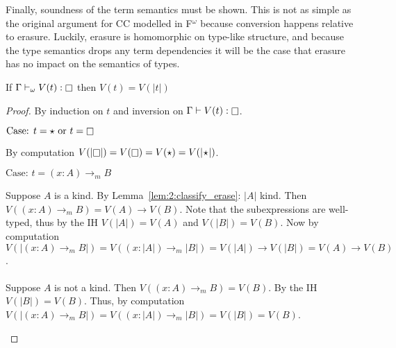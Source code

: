 Finally, soundness of the term semantics must be shown.
This is not as simple as the original argument for CC modelled in F$^\omega$ because conversion happens relative to erasure.
Luckily, erasure is homomorphic on type-like structure, and because the type semantics drops any term dependencies it will be the case that erasure has no impact on the semantics of types.

\begin{lemma}
    \label{lem:3:vsema_erase}
    If $\Gamma \vdash_\omega V(t) : \kind$ then $V(t) = V(|t|)$
\end{lemma}
\begin{proof}
    By induction on $t$ and inversion on $\Gamma \vdash V(t) : \kind$.

    $\text{Case: } t = \star \text{ or } t = \kind$
    \begin{proofcase}
        By computation $V(|\kind|) = V(\kind) = V(\star) = V(|\!\star\!|)$.
    \end{proofcase}

    $\text{Case: } t = (x : A) \to_m B$
    \begin{proofcase}
        Suppose $A$ is a kind.
        By Lemma~\ref{lem:2:classify_erase}: $|A|$ kind.
        Then $V((x : A) \to_m B) = V(A) \to V(B)$.
        Note that the subexpressions are well-typed, thus by the IH $V(|A|) = V(A)$ and $V(|B|) = V(B)$.
        Now by computation $V(|(x : A) \to_m B|) = V((x : |A|) \to_m |B|) = V(|A|) \to V(|B|) = V(A) \to V(B)$.
        \\ \\
        Suppose $A$ is not a kind.
        Then $V((x : A) \to_m B) = V(B)$.
        By the IH $V(|B|) = V(B)$.
        Thus, by computation $V(|(x : A) \to_m B|) = V((x : |A|) \to_m |B|) = V(|B|) = V(B)$.
    \end{proofcase}
\end{proof}

